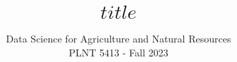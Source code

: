 \title{$title$}
\author{Data Science for Agriculture and Natural Resources\\
PLNT 5413 - Fall 2023}
\date{}